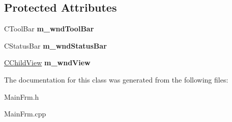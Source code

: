 \subsection*{Protected Attributes}
\begin{DoxyCompactItemize}
\item 
\mbox{\label{class_c_main_frame_a73024d794dce2fe918f6b117371c25fc}} 
C\+Tool\+Bar {\bfseries m\+\_\+wnd\+Tool\+Bar}
\item 
\mbox{\label{class_c_main_frame_ac01bafc03aee69cf982e6f029b4db6b0}} 
C\+Status\+Bar {\bfseries m\+\_\+wnd\+Status\+Bar}
\item 
\mbox{\label{class_c_main_frame_a7c3af9327c496f8c807d578f7a4ef4c5}} 
\hyperlink{class_c_child_view}{C\+Child\+View} {\bfseries m\+\_\+wnd\+View}
\end{DoxyCompactItemize}


The documentation for this class was generated from the following files\+:\begin{DoxyCompactItemize}
\item 
Main\+Frm.\+h\item 
Main\+Frm.\+cpp\end{DoxyCompactItemize}
